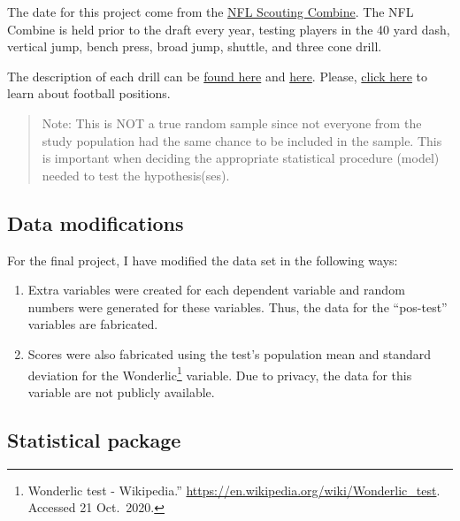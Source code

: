 \documentclass[
]{article}
\begin{document}
The date for this project come from the \href{https://en.wikipedia.org/wiki/NFL_Scouting_Combine}{NFL Scouting Combine}. The NFL Combine is held prior to the draft every year, testing players in the 40 yard dash, vertical jump, bench press, broad jump, shuttle, and three cone drill.

The description of each drill can be \href{https://nflcombineresults.com/nfl-combine-drills-101-what-each-drill-measures/}{found here} and \href{https://www.espn.com/nfl/draft2018/story/_/id/22587931/guide-nfl-draft-combine-drills-todd-mcshay-numbers-know-40-yard-dash-short-shuttle-bench-press}{here}. Please, \href{https://protips.dickssportinggoods.com/sports-and-activities/football/football-101-football-positions-and-their-roles}{click here} to learn about football positions.

\begin{quote}
Note: This is NOT a true random sample since not everyone from the study population had the same chance to be included in the sample. This is important when deciding the appropriate statistical procedure (model) needed to test the hypothesis(ses).
\end{quote}

\hypertarget{data-modifications}{%
\subsection{Data modifications}\label{data-modifications}}

For the final project, I have modified the data set in the following ways:

\begin{enumerate}
\def\labelenumi{\arabic{enumi}.}
\item
  Extra variables were created for each dependent variable and random numbers were generated for these variables. Thus, the data for the ``pos-test'' variables are fabricated.
\item
  Scores were also fabricated using the test's population mean and standard deviation for the Wonderlic\footnote{Wonderlic test - Wikipedia.'' \url{https://en.wikipedia.org/wiki/Wonderlic_test}. Accessed 21 Oct.~2020.} variable. Due to privacy, the data for this variable are not publicly available.
\end{enumerate}

\hypertarget{statistical-package}{%
\subsection{Statistical package}\label{statistical-package}}
\end{document}
